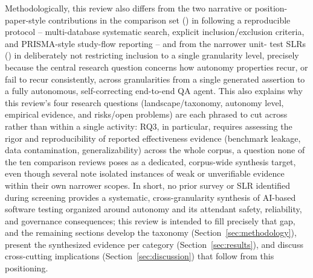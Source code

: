 Methodologically, this review also differs from the two narrative or
position-paper-style contributions in the comparison set
(\cite{slr0032023,slr0102024}) in following a reproducible
protocol -- multi-database systematic search, explicit
inclusion/exclusion criteria, and PRISMA-style study-flow reporting
\cite{kitchenham2007,page2021prisma} -- and from the narrower unit-
test SLRs (\cite{slr0072025,slr0082025}) in deliberately not
restricting inclusion to a single granularity level, precisely because
the central research question concerns how autonomy properties
recur, or fail to recur consistently, across granularities from a
single generated assertion to a fully autonomous, self-correcting
end-to-end QA agent. This also explains why this review's four
research questions (landscape/taxonomy, autonomy level, empirical
evidence, and risks/open problems) are each phrased to cut across
rather than within a single activity: RQ3, in particular, requires
assessing the rigor and reproducibility of reported effectiveness
evidence (benchmark leakage, data contamination, generalizability)
across the whole corpus, a question none of the ten comparison
reviews poses as a dedicated, corpus-wide synthesis target, even
though several note isolated instances of weak or unverifiable
evidence within their own narrower scopes. In short, no prior survey or SLR identified
during screening provides a systematic, cross-granularity synthesis of
AI-based software testing organized around autonomy and its attendant
safety, reliability, and governance consequences; this review is
intended to fill precisely that gap, and the remaining sections
develop the taxonomy (Section~\ref{sec:methodology}), present the
synthesized evidence per category (Section~\ref{sec:results}), and
discuss cross-cutting implications (Section~\ref{sec:discussion}) that
follow from this positioning.
